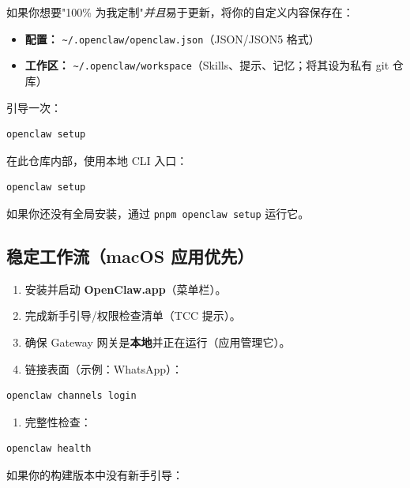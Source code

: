 如果你想要"100\% 为我定制"\textit{并且}易于更新，将你的自定义内容保存在：

\begin{itemize}
  \item \textbf{配置：} \texttt{\textasciitilde{}/.openclaw/openclaw.json}（JSON/JSON5 格式）
  \item \textbf{工作区：} \texttt{\textasciitilde{}/.openclaw/workspace}（Skills、提示、记忆；将其设为私有 git 仓库）
\end{itemize}


引导一次：

\begin{lstlisting}[language=bash]
openclaw setup
\end{lstlisting}


在此仓库内部，使用本地 CLI 入口：

\begin{lstlisting}[language=bash]
openclaw setup
\end{lstlisting}


如果你还没有全局安装，通过 \texttt{pnpm openclaw setup} 运行它。

\subsection{稳定工作流（macOS 应用优先）}


\begin{enumerate}
  \item 安装并启动 \textbf{OpenClaw.app}（菜单栏）。
  \item 完成新手引导/权限检查清单（TCC 提示）。
  \item 确保 Gateway 网关是\textbf{本地}并正在运行（应用管理它）。
  \item 链接表面（示例：WhatsApp）：
\end{enumerate}


\begin{lstlisting}[language=bash]
openclaw channels login
\end{lstlisting}


\begin{enumerate}
  \item 完整性检查：
\end{enumerate}


\begin{lstlisting}[language=bash]
openclaw health
\end{lstlisting}


如果你的构建版本中没有新手引导：

